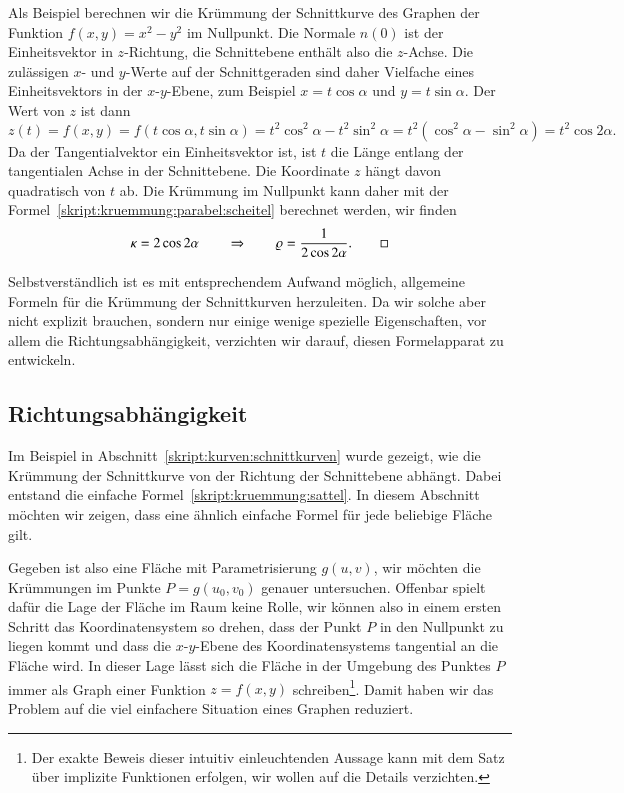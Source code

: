 \begin{beispiel}
\label{skript:sattelbeispiel}
Als Beispiel berechnen wir die Krümmung der Schnittkurve des Graphen
der Funktion
$f(x,y) = x^2-y^2$ im Nullpunkt.
Die Normale $n(0)$ ist der Einheitsvektor in $z$-Richtung, die Schnitt\-ebene
enthält also die $z$-Achse.
Die zulässigen $x$- und $y$-Werte auf der Schnittgeraden sind daher Vielfache
eines Einheitsvektors in der $x$-$y$-Ebene, zum Beispiel $x=t\cos\alpha$
und $y=t\sin\alpha$.
Der Wert von $z$ ist dann
\[
z(t)
=
f(x,y)
=
f(t\cos\alpha,t\sin\alpha)
=
t^2\cos^2\alpha - t^2\sin^2\alpha
=
t^2(\cos^2\alpha - \sin^2\alpha)
=
t^2\cos 2\alpha.
\]
Da der Tangentialvektor ein Einheitsvektor ist, ist $t$ die Länge entlang
der tangentialen Achse in der Schnittebene.
Die Koordinate $z$ hängt davon quadratisch von $t$ ab.
Die Krümmung im Nullpunkt kann daher mit der
Formel~\eqref{skript:kruemmung:parabel:scheitel}
berechnet werden, wir finden
\begin{equation}
\kappa = 2\cos2\alpha
\qquad\Rightarrow\qquad
\varrho = \frac1{2\cos2\alpha}.
\label{skript:kruemmung:sattel}
\qedhere
\end{equation}
\end{beispiel}

Selbstverständlich ist es mit entsprechendem Aufwand möglich, allgemeine
Formeln für die Krümmung der Schnittkurven herzuleiten.
Da wir solche aber nicht explizit brauchen, sondern nur einige wenige
spezielle Eigenschaften, vor allem die Richtungsabhängigkeit, verzichten
wir darauf, diesen Formelapparat zu entwickeln.

\subsection{Richtungsabhängigkeit%
\label{skript:kruemmung:richtungsabhaengigkeit}}
Im Beispiel in Abschnitt~\ref{skript:kurven:schnittkurven}
wurde gezeigt, wie die Krümmung der Schnittkurve von der Richtung
der Schnittebene abhängt.
Dabei entstand die einfache Formel~\eqref{skript:kruemmung:sattel}.
In diesem Abschnitt möchten wir zeigen, dass eine ähnlich einfache
Formel für jede beliebige Fläche gilt.

Gegeben ist also eine Fläche mit Parametrisierung $g(u,v)$, wir möchten
die Krümmungen im Punkte $P=g(u_0,v_0)$ genauer untersuchen.
Offenbar spielt dafür die Lage der Fläche im Raum keine Rolle, wir können
also in einem ersten Schritt das Koordinatensystem so drehen, dass der
Punkt $P$ in den Nullpunkt zu liegen kommt und dass die $x$-$y$-Ebene des
Koordinatensystems tangential an die Fläche wird.
In dieser Lage lässt sich die Fläche in der Umgebung des Punktes $P$
immer als Graph einer Funktion
$z=f(x,y)$ schreiben\footnote{%
Der exakte Beweis dieser intuitiv einleuchtenden Aussage kann mit
dem Satz über implizite Funktionen erfolgen, wir wollen auf die Details
verzichten.}.
Damit haben wir das Problem auf die viel einfachere Situation eines
Graphen reduziert.

